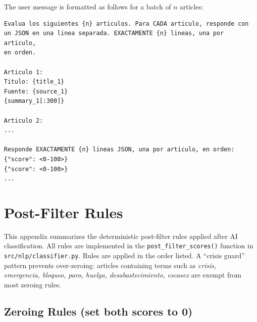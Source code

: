 \documentclass[12pt,a4paper]{article}
\begin{document}
The user message is formatted as follows for a batch of $n$ articles:

\begin{lstlisting}
Evalua los siguientes {n} articulos. Para CADA articulo, responde con
un JSON en una linea separada. EXACTAMENTE {n} lineas, una por articulo,
en orden.

Articulo 1:
Titulo: {title_1}
Fuente: {source_1}
{summary_1[:300]}

Articulo 2:
...

Responde EXACTAMENTE {n} lineas JSON, una por articulo, en orden:
{"score": <0-100>}
{"score": <0-100>}
...
\end{lstlisting}

\section{Post-Filter Rules}
\label{app:postfilter}

This appendix summarizes the deterministic post-filter rules applied after
AI classification.  All rules are implemented in the
\texttt{post\_filter\_scores()} function in
\texttt{src/nlp/classifier.py}.  Rules are applied in the order listed.
A ``crisis guard'' pattern prevents over-zeroing: articles containing
terms such as \textit{crisis, emergencia, bloqueo, paro, huelga,
desabastecimiento, escasez} are exempt from most zeroing rules.

\subsection*{Zeroing Rules (set both scores to 0)}
\end{document}
